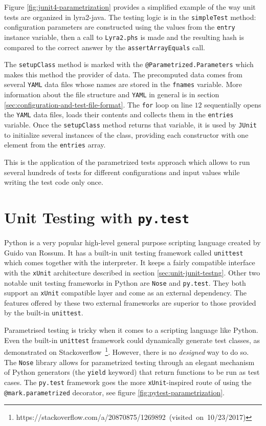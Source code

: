 Figure \ref{fig:junit4-parametrization} provides a simplified example of the way unit tests are organized in lyra2-java. The testing logic is in the \texttt{simpleTest} method: configuration parameters are constructed using the values from the \texttt{entry} instance variable, then a call to \texttt{Lyra2.phs} is made and the resulting hash is compared to the correct answer by the \texttt{assertArrayEquals} call.

The \texttt{setupClass} method is marked with the \texttt{@Parametrized.Parameters} which makes this method the provider of data. The precomputed data comes from several \texttt{YAML} data files whose names are stored in the \texttt{fnames} variable. More information about the file structure and \texttt{YAML} in general is in section \ref{sec:configuration-and-test-file-format}. The \texttt{for} loop on line \(12\) sequentially opens the \texttt{YAML} data files, loads their contents and collects them in the \texttt{entries} variable. Once the \texttt{setupClass} method returns that variable, it is used by \texttt{JUnit} to initialize several instances of the class, providing each constructor with one element from the \texttt{entries} array.

This is the application of the parametrized tests approach which allows to run several hundreds of tests for different configurations and input values while writing the test code only once.

\section{Unit Testing with \texttt{py.test}}
\label{sec:unit-pytest}

Python is a very popular high-level general purpose scripting language created by Guido van Rossum. It has a built-in unit testing framework called \texttt{unittest} which comes together with the interpreter. It keeps a fairly compatible interface with the \texttt{xUnit} architecture described in section \ref{sec:unit-junit-testng}. Other two notable unit testing frameworks in Python are \texttt{Nose} and \texttt{py.test}. They both support an \texttt{xUnit} compatible layer and come as an external dependency. The features offered by these two external frameworks are superior to those provided by the built-in \texttt{unittest}.

Parametrised testing is tricky when it comes to a scripting language like Python. Even the built-in \texttt{unittest} framework could dynamically generate test classes, as demonstrated on \mbox{Stackoverflow \footnote{https://stackoverflow.com/a/20870875/1269892 (visited on 10/23/2017)}}. However, there is no \emph{designed} way to do so. The \texttt{Nose} library allows for parametrized testing through an elegant mechanism of Python generators (the \texttt{yield} keyword) that return functions to be run as test cases. The \texttt{py.test} framework goes the more \texttt{xUnit}-inspired route of using the \texttt{@mark.parametrized} decorator, see figure \ref{fig:pytest-parametrization}.

